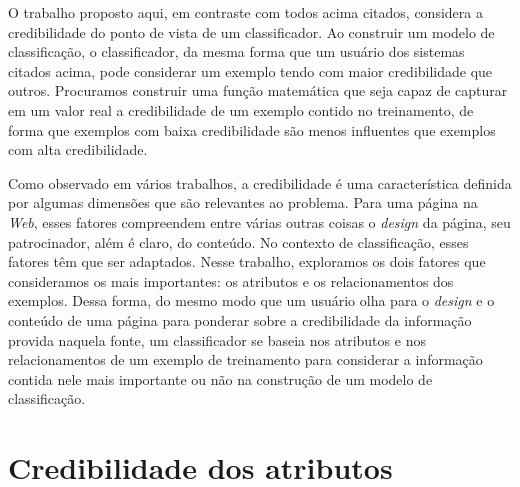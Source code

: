 O trabalho proposto aqui, em contraste com todos acima citados, considera a credibilidade do ponto de vista de um classificador. Ao construir um modelo de classificação, o classificador, da mesma forma que um usuário dos sistemas citados acima, pode considerar um exemplo tendo com maior credibilidade que outros. Procuramos construir uma função matemática que seja capaz de capturar em um valor real a credibilidade de um exemplo contido no treinamento, de forma que exemplos com baixa credibilidade são menos influentes que exemplos com alta credibilidade.

Como observado em vários trabalhos, a credibilidade é uma característica definida por algumas dimensões que são relevantes ao problema. Para uma página na \textit{Web}, esses fatores compreendem entre várias outras coisas o \textit{design} da página, seu patrocinador, além é claro, do conteúdo. No contexto de classificação, esses fatores têm que ser adaptados. Nesse trabalho, exploramos os dois fatores que consideramos os mais importantes: os atributos e os relacionamentos dos exemplos. Dessa forma, do mesmo modo que um usuário olha para o \textit{design} e o conteúdo de uma página para ponderar sobre a credibilidade da informação provida naquela fonte, um classificador se baseia nos atributos e nos relacionamentos de um exemplo de treinamento para considerar a informação contida nele mais importante ou não na construção de um modelo de classificação.



\section{Credibilidade dos atributos}
\label{sec::supervised}

